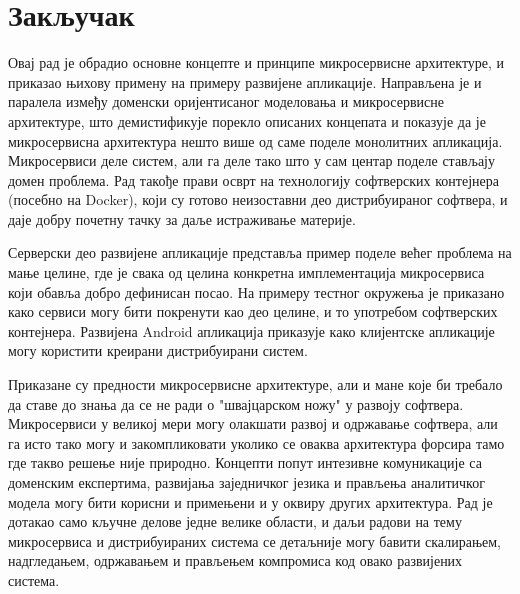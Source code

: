 \documentclass[12pt,oneside]{memoir}
\begin{document}
\chapter{Закључак}
Овај рад је обрадио основне концепте и принципе микросервисне архитектуре, и приказао њихову примену на примеру развијене апликације. Направљена је и паралела између доменски оријентисаног моделовања и микросервисне архитектуре, што демистификује порекло описаних концепата и показује да је микросервисна архитектура нешто више од саме поделе монолитних апликација. Микросервиси деле систем, али га деле тако што у сам центар поделе стављају домен проблема. Рад такође прави осврт на технологију софтверских контејнера (посебно на Docker), који су готово неизоставни део дистрибуираног софтвера, и даје добру почетну тачку за даље истраживање материје.

Серверски део развијене апликације представља пример поделе већег проблема на мање целине, где је свака од целина конкретна имплементација микросервиса који обавља добро дефинисан посао. На примеру тестног окружења је приказано како сервиси могу бити покренути као део целине, и то употребом софтверских контејнера. Развијена Android апликација приказује како клијентске апликације могу користити креирани дистрибуирани систем.

Приказане су предности микросервисне архитектуре, али и мане које би требало да ставе до знања да се не ради о "швајцарском ножу" у развоју софтвера. Микросервиси у великој мери могу олакшати развој и одржавање софтвера, али га исто тако могу и закомпликовати уколико се оваква архитектура форсира тамо где такво решење није природно. Концепти попут интезивне комуникације са доменским експертима, развијања заједничког језика и прављења аналитичког модела могу бити корисни и примењени и у оквиру других архитектура. Рад је дотакао само кључне делове једне велике области, и даљи радови на тему микросервиса и дистрибуираних система се детаљније могу бавити скалирањем, надгледањем, одржавањем и прављењем компромиса код овако развијених система.

\literatura

\end{document}
